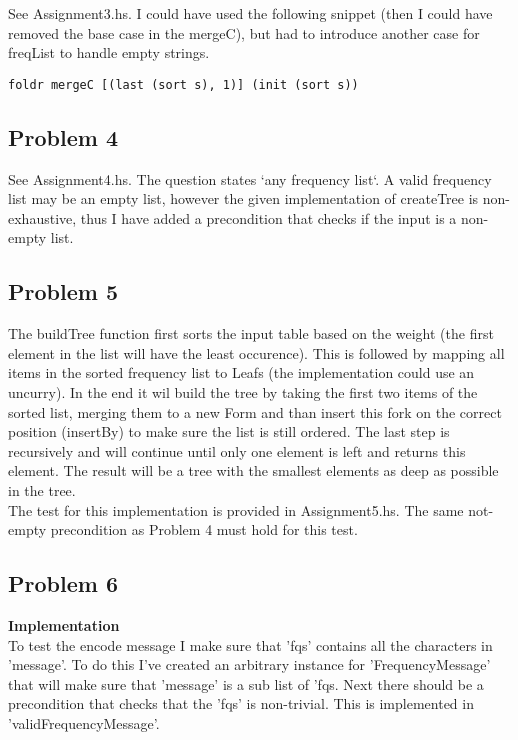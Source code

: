 See Assignment3.hs. I could have used the following snippet (then I could have removed the base case in the mergeC), but had to introduce another case for freqList to handle empty strings.

\begin{lstlisting}
foldr mergeC [(last (sort s), 1)] (init (sort s))
\end{lstlisting}


\subsection*{Problem 4}

See Assignment4.hs. The question states `any frequency list`. A valid frequency list may be an empty list, however the given implementation of createTree is non-exhaustive,
thus I have added a precondition that checks if the input is a non-empty list.

\subsection*{Problem 5}

The buildTree function first sorts the input table based on the weight (the first element in the list will have the least occurence).
This is followed by mapping all items in the sorted frequency list to Leafs (the implementation could use an uncurry).
In the end it wil build the tree by taking the first two items of the sorted list, merging them to a new Form and than insert this fork on the correct position (insertBy) to make sure the list is still ordered.
The last step is recursively and will continue until only one element is left and returns this element.
The result will be a tree with the smallest elements as deep as possible in the tree. \\
The test for this implementation is provided in Assignment5.hs. The same not-empty precondition as Problem 4 must hold for this test.

\subsection*{Problem 6}

\textbf{Implementation} \\
To test the encode message I make sure that 'fqs' contains all the characters in 'message'. To do this I've created an arbitrary instance for 'FrequencyMessage' that will make sure that 'message' is a sub list of 'fqs.
Next there should be a precondition that checks that the 'fqs' is non-trivial. This is implemented in 'validFrequencyMessage'. \\

